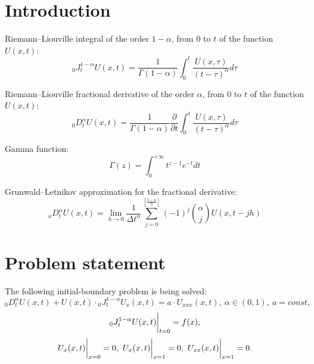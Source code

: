\documentclass[11pt, oneside, a4paper]{article}
\newcommand {\partt} {\frac{\partial}{\partial t}}
\newcommand {\dt} {\Delta t}
\begin{document}
\section{Introduction}
\begin{definition}
	Riemann--Liouville integral of the order $1 - \alpha$, from $0$ to $t$ of the function $U(x,t)$:
	\begin{equation}
	{}_{0}J_{t}^{1-\alpha} U(x,t) = \frac{1}{\Gamma(1-\alpha)} \int_{0}^{t} \frac{U(x,\tau)}{(t-\tau)^{\alpha}}d\tau
	\end{equation}
\end{definition}
\begin{definition}
	Riemann--Liouville fractional derivative of the order $\alpha$, from $0$ to $t$ of the function $U(x,t)$:
	\begin{equation}
	{}_{0}D_{t}^{\alpha} U(x,t) = \frac{1}{\Gamma(1-\alpha)} \partt \int_{0}^{t} \frac{U(x,\tau)}{(t-\tau)^{\alpha}}d\tau
	\end{equation}
\end{definition}
\begin{definition}
	Gamma function:
	\begin{equation}
	\Gamma(z)=\int_{0}^{+\infty}t^{z-1} e^{-t} dt
	\end{equation}
\end{definition}
\begin{definition}
	Grunwald--Letnikov approximation for the fractional derivative:
	\begin{equation}
	{}_{a}D_{t}^{\alpha}U(x,t) = \lim_{h \to 0} \frac{1}{\dt^{\alpha}} \sum_{j = 0}^{\left[\frac{t-a}{h} \right]} (-1)^{j} \binom{\alpha}{j} U(x, t - jh)
	\end{equation}
\end{definition}

\section{Problem statement}
The following initial-boundary problem is being solved:
\begin{equation}
	{}_{0}D_{t}^{\alpha}U(x,t) + U(x,t)\cdot {}_{0}J^{1-\alpha}_{t}U_{x}(x,t)=a \cdot U_{xxx}(x,t),~\alpha \in (0, 1),~a = const,
\end{equation}
\begin{equation}
	{}_{0}J^{1-\alpha}_{t}U(x,t) \bigg{|}_{t=0} = f(x),
\end{equation}
\begin{equation}
U_{x}(x,t) \bigg{|}_{x=0}=0,~U_{x}(x,t) \bigg{|}_{x=1}=0,~U_{xx}(x,t) \bigg{|}_{x=1}=0.
\end{equation}
\end{document}
